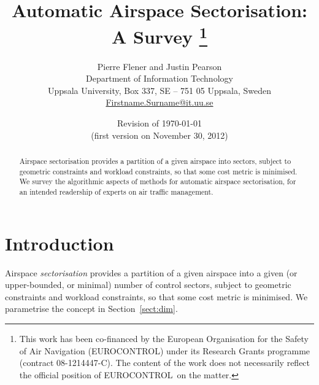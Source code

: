 \documentclass[a4paper,12pt]{article}
\newcommand{\EuroControl}{EUROCONTROL}
\begin{document}
\title{{\bf Automatic Airspace Sectorisation: \\
    A Survey \thanks{This work has been co-financed by the European
      Organisation for the Safety of Air Navigation (\EuroControl)
      under its Research Grants programme (contract 08-1214447-C).
      The content of the work does not necessarily reflect the
      official position of \EuroControl\ on the matter.}
  }}

\author{Pierre Flener and Justin Pearson \\
  Department of Information Technology \\
  Uppsala University, Box 337, SE -- 751 05 Uppsala, Sweden \\
  \url{Firstname.Surname@it.uu.se}}

\date{Revision of \today \\ (first version on November 30, 2012)}

\maketitle

\begin{abstract} \noindent
  Airspace sectorisation provides a partition of a given airspace into
  sectors, subject to geometric constraints and workload constraints,
  so that some cost metric is minimised.  We survey the algorithmic
  aspects of methods for automatic airspace sectorisation, for an
  intended readership of experts on air traffic management.
\end{abstract}

\section{Introduction}

Airspace \emph{sectorisation} provides a partition of a given airspace
into a given (or upper-bounded, or minimal) number of control sectors,
subject to geometric constraints and workload constraints, so that
some cost metric is minimised.  We parametrise the concept in
Section~\ref{sect:dim}.
\end{document}
